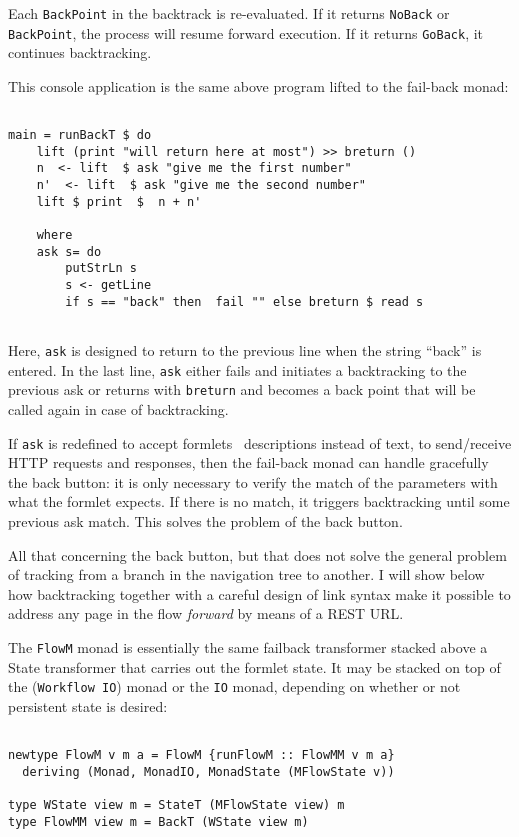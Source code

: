 \documentclass{tmr}
\begin{document}
Each {\tt BackPoint} in the backtrack is re-evaluated. If it returns {\tt NoBack} or {\tt BackPoint}, the process will resume forward execution. If it returns {\tt GoBack}, it continues backtracking. 
 
This console application is the same above program lifted to the fail-back monad: 
 
{\tt 
 
\begin{verbatim} 
 
main = runBackT $ do 
    lift (print "will return here at most") >> breturn () 
    n  <- lift  $ ask "give me the first number" 
    n'  <- lift  $ ask "give me the second number" 
    lift $ print  $  n + n' 
 
    where 
    ask s= do 
        putStrLn s 
        s <- getLine 
        if s == "back" then  fail "" else breturn $ read s 
 
\end{verbatim} 
 
} 
 
Here, {\tt ask} is designed to return to the  previous line  when the string ``back'' is entered. In the last line, {\tt ask} either fails and initiates a backtracking to the previous ask or returns with {\tt breturn} and becomes a back point that will be called again in case of backtracking. 
 
If {\tt ask} is redefined to accept formlets~\cite{auth:formlets} descriptions instead of text, to send/receive HTTP requests and 
responses, then the fail-back monad can handle gracefully the  back button: it is only necessary to verify the match of the parameters with what the formlet expects. If there is no match, it triggers backtracking until some previous ask match. This solves the problem of the back button. 
 
All that concerning the back button, but that does not solve the general problem of tracking from a branch in the navigation tree to another.  I will show below how backtracking together with a careful design of link syntax make it possible to address any page in the flow \textit{forward} by means of a REST URL\@. 
 
The {\tt FlowM} monad is essentially the same failback transformer stacked above a State transformer that carries out the formlet state. It may be stacked on top of the ({\tt Workflow IO}) monad or the {\tt IO} monad, depending on whether or not persistent state is desired: 
 
{\tt 
 
\begin{verbatim} 
 
newtype FlowM v m a = FlowM {runFlowM :: FlowMM v m a} 
  deriving (Monad, MonadIO, MonadState (MFlowState v)) 
 
type WState view m = StateT (MFlowState view) m 
type FlowMM view m = BackT (WState view m) 
 
\end{verbatim} 
 
} 
 
\end{document}
